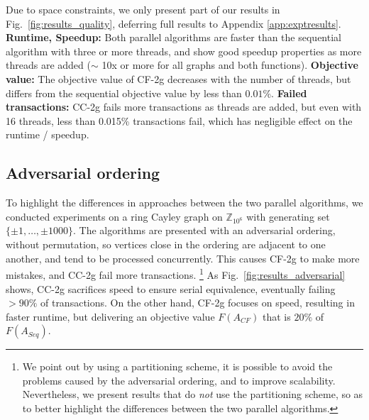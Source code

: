 \documentclass{article} %
\newcommand{\hogwild}{CF-2g}
\newcommand{\occ}{CC-2g}
\newcommand{\hogwildshort}{CF}
\newcommand{\seqalgshort}{Seq}
\newcommand{\Comments}{1}
\newcommand{\note}[2]{\ifnum\Comments=1\textcolor{#1}{#2}\fi}
\newcommand{\xinghao}[1]{\note{red}{[XP: #1]}}
\newcommand{\figref}[1]{Fig.~\ref{#1}}
\begin{document}
Due to space constraints, we only present part of our results in \figref{fig:results_quality}, deferring full results to Appendix \ref{app:exptresults}.
\textbf{Runtime, Speedup:} Both parallel algorithms are faster than the sequential algorithm with three or more threads, and show good speedup properties as more threads are added ($\sim$ 10x or more for all graphs and both functions).
\textbf{Objective value:} The objective value of \hogwild{} decreases with the number of threads, but differs from the sequential objective value by less than $0.01\%$.
\textbf{Failed transactions:} \occ{} fails more transactions as threads are added, but even with 16 threads, less than 0.015\% transactions fail, which has negligible effect on the runtime / speedup.

\subsection{Adversarial ordering}

To highlight the differences in approaches between the two parallel algorithms, we conducted experiments on a ring Cayley graph on $\mathbb{Z}_{10^6}$ with generating set $\{\pm 1,\dots, \pm 1000\}$.
The algorithms are presented with an adversarial ordering, without permutation, so vertices close in the ordering are adjacent to one another, and tend to be processed concurrently.
This causes \hogwild{} to make more mistakes, and \occ{} fail more transactions.
\footnote{
We point out by using a partitioning scheme, it is possible to avoid the problems caused by the adversarial ordering, and to improve scalability.
Nevertheless, we present results that do \emph{not} use the partitioning scheme, so as to better highlight the differences between the two parallel algorithms.
}
As \figref{fig:results_adversarial} shows, \occ{}  sacrifices speed to ensure serial equivalence, eventually failing $>90\%$ of transactions.
On the other hand, \hogwild{} focuses on speed, resulting in faster runtime, but delivering an objective value $F(A_{\hogwildshort{}})$ that is $20\%$ of $F(A_{\seqalgshort{}})$.
\end{document}
